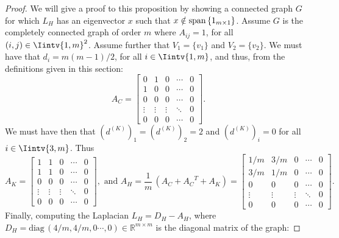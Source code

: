 \begin{proof}
   We will give a proof to this proposition by showing a connected graph $G$ for which $L_H$ has an eigenvector $x$ such that $x \notin \mathcal {\operatorname{span\,}} \{ 1_{m \times 1} \}$. 
   Assume $G$ is the completely connected graph of order $m$ where $A_{ij} = 1$, for all $(i,j) \in \Iintv{1,m}^2$.
   Assume further that $V_1 = \{ v_1 \}$ and $V_2 = \{ v_2 \}$.
   We must have that $d_i = m(m-1)/2$, for all $i \in \Iintv{1,m}$, and thus, from the definitions given in this section:
   \begin{equation*}
      A_C = 
      \begin{bmatrix}
         0 & 1 & 0 & \cdots & 0 \\
         1 & 0 & 0 & \cdots & 0 \\
         0 & 0 & 0 & \cdots & 0 \\
         \vdots & \vdots & \vdots & \ddots & 0 \\
         0 & 0 & 0 & \cdots & 0 
      \end{bmatrix}.
   \end{equation*}
   We must have then that $\left( d^{(K)} \right) _1 = \left( d^{(K)} \right)_2 = 2$ and $\left( d^{(K)} \right)_i = 0$ for all $i \in \Iintv{3,m}$. Thus
   \begin{equation*}
      A_K =
      \begin{bmatrix}
         1 & 1 & 0 & \cdots & 0 \\
         1 & 1 & 0 & \cdots & 0 \\
         0 & 0 & 0 & \cdots & 0 \\
         \vdots & \vdots & \vdots & \ddots & 0 \\
         0 & 0 & 0 & \cdots & 0 
      \end{bmatrix},
      \text{ and }
      A_H = \frac{1}{m} \, (A_C + {A_C}^T + A_K) = 
      \begin{bmatrix}
         1/m & 3/m & 0 & \cdots & 0 \\
         3/m & 1/m & 0 & \cdots & 0 \\
         0 & 0 & 0 & \cdots & 0 \\
         \vdots & \vdots & \vdots & \ddots & 0 \\
         0 & 0 & 0 & \cdots & 0 
      \end{bmatrix}.
   \end{equation*}
   Finally, computing the Laplacian $L_H = D_H - A_H$, where $D_H = \text{diag} \,(4/m, 4/m, 0 \cdots, 0) \in \mathbb R^{m \times m}$ is the diagonal matrix of the graph:

\end{proof}
